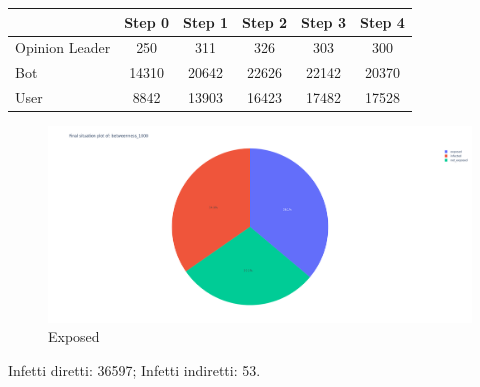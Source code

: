             \begin{table}[H]
                \centering
                \begin{tabular}{|l|c|c|c|c|c|}
                \hline
                               & Step 0 & Step 1 & Step 2 & Step 3 & Step 4 \\ \hline
                Opinion Leader & 250    & 311    & 326    & 303    & 300    \\ \hline
                Bot            & 14310  & 20642  & 22626  & 22142  & 20370  \\ \hline
                User           & 8842   & 13903  & 16423  & 17482  & 17528  \\ \hline
                \end{tabular}
            \end{table}
            
            \begin{figure}[H]
                \includegraphics[width=16cm]{resources/charts/btw_1000_pie.png}
                \caption{Exposed}
                \label{fig:btw_1000_pie}
            \end{figure}
            Infetti diretti: 36597;\newline
            Infetti indiretti: 53.
            
            
